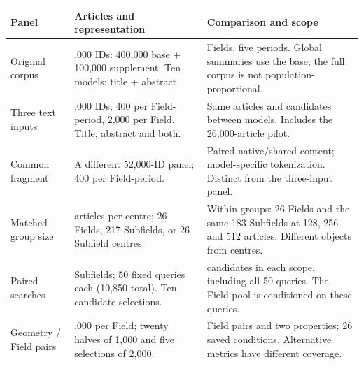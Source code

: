 \par\noindent\begin{minipage}{\linewidth}
\small
\setlength{\tabcolsep}{4pt}
\renewcommand{\arraystretch}{1.13}
\label{tab:T01}
\begin{tabular}{@{}>{\raggedright\arraybackslash}p{2.9cm}>{\raggedright\arraybackslash}p{5.8cm}>{\raggedright\arraybackslash}p{6.45cm}@{}}
\toprule
\textbf{Panel} & \textbf{Articles and representation} & \textbf{Comparison and scope} \\
\midrule
Original corpus & 500,000 IDs: 400,000 base + 100,000 supplement. Ten models; title + abstract. & 26 Fields, five periods. Global summaries use the base; the full corpus is not population-proportional. \\
\addlinespace[7pt]
Three text inputs & 52,000 IDs; 400 per Field-period, 2,000 per Field. Title, abstract and both. & Same articles and candidates between models. Includes the 26,000-article pilot. \\
\addlinespace[7pt]
Common fragment & A different 52,000-ID panel; 400 per Field-period. & Paired native/shared content; model-specific tokenization. Distinct from the three-input panel. \\
\addlinespace[7pt]
Matched group size & 256 articles per centre; 26 Fields, 217 Subfields, or 26 Subfield centres. & Within groups: 26 Fields and the same 183 Subfields at 128, 256 and 512 articles. Different objects from centres. \\
\addlinespace[7pt]
Paired searches & 217 Subfields; 50 fixed queries each (10,850 total). Ten candidate selections. & 256 candidates in each scope, including all 50 queries. The Field pool is conditioned on these queries. \\
\addlinespace[7pt]
Geometry / Field pairs & 2,000 per Field; twenty halves of 1,000 and five selections of 2,000. & 325 Field pairs and two properties; 26 saved conditions. Alternative metrics have different coverage. \\
\bottomrule
\end{tabular}
\end{minipage}\par
\par{}
